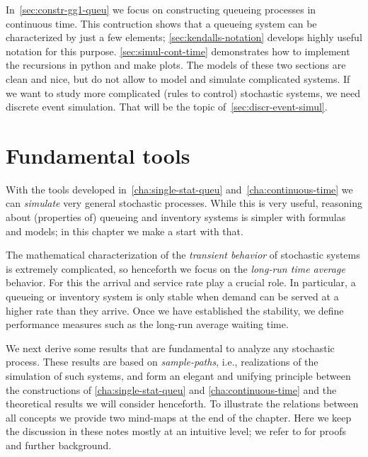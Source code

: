 In~\cref{sec:constr-gg1-queu} we focus on constructing queueing processes in continuous time.
This contruction shows that a queueing system can be characterized by just a few elements; \cref{sec:kendalls-notation} develops highly useful notation for this purpose.
\cref{sec:simul-cont-time} demonstrates how to implement the recursions in python and make plots.
The models of these two sections are clean and nice, but do not allow to model and simulate complicated systems.
If we want to study more complicated (rules to control) stochastic  systems, we need discrete event simulation.
That will be the topic of~\cref{sec:discr-event-simul}.










% 




\chapter{Fundamental tools}
\label{cha:fundamental-tools}

With the tools developed in~\cref{cha:single-stat-queu} and~\cref{cha:continuous-time} we can \emph{simulate} very general stochastic processes.
While this is very useful, reasoning about (properties of) queueing and inventory systems is simpler with formulas and models;  in this chapter we make a start with that.

The mathematical characterization of the \emph{transient behavior} of stochastic systems is extremely complicated, so henceforth we focus on the \emph{long-run time average} behavior. For this the arrival and service rate play a crucial role. %
In particular, a queueing or inventory system is only stable when demand can be served at a higher rate than they arrive.
Once we have established the stability, we  define performance measures such as the long-run average waiting time.

We next derive some results that are fundamental to analyze any stochastic process.
These results are based on \emph{sample-paths}, i.e., realizations of the simulation of such systems, and form an elegant and unifying principle between the constructions of \cref{cha:single-stat-queu} and \cref{cha:continuous-time} and the theoretical results we will consider henceforth.
To illustrate the relations between all concepts we provide two mind-maps at the end of the chapter.
Here we keep the discussion in these notes mostly at an intuitive level; we refer to \cite{el-taha98:_sampl_path_analy_queuein_system} for proofs and further background.


